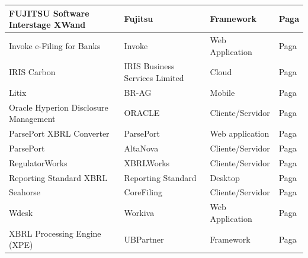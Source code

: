 \documentclass[12pt]{article}
\begin{document}
\begin{table}[htb]
{\begin{tabular}{|l|l|l|l|}
FUJITSU Software Interstage XWand                 & Fujitsu                                     & Framework                                 & Paga                                  \\ \hline
Invoke e-Filing for Banks                         & Invoke                                      & Web Application                           & Paga                                  \\ \hline
IRIS Carbon                                       & IRIS Business Services Limited              & Cloud                                     & Paga                                  \\ \hline
Litix                                             & BR-AG                                       & Mobile                                    & Paga                                  \\ \hline
Oracle Hyperion Disclosure Management             & ORACLE                                      & Cliente/Servidor                          & Paga                                  \\ \hline
ParsePort XBRL Converter                          & ParsePort                                   & Web application                           & Paga                                  \\ \hline
ParsePort                                         & AltaNova                                    & Cliente/Servidor                          & Paga                                  \\ \hline
RegulatorWorks                                    & XBRLWorks                                   & Cliente/Servidor                          & Paga                                  \\ \hline
Reporting Standard XBRL                           & Reporting Standard                          & Desktop                                   & Paga                                  \\ \hline
Seahorse                                          & CoreFiling                                  & Cliente/Servidor                          & Paga                                  \\ \hline
Wdesk                                             & Workiva                                     & Web Application                           & Paga                                  \\ \hline
XBRL Processing Engine (XPE)                      & UBPartner                                   & Framework                                 & Paga                                  \\ \hline

\end{tabular}}
\end{table}
\end{document}
